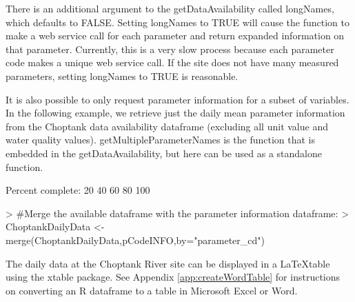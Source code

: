 \documentclass[a4paper,11pt]{article}
\begin{document}
There is an additional argument to the getDataAvailability called longNames, which defaults to FALSE. Setting longNames to TRUE will cause the function to make a web service call for each parameter and return expanded information on that parameter. Currently, this is a very slow process because each parameter code makes a unique web service call. If the site does not have many measured parameters, setting longNames to TRUE is reasonable.

It is also possible to only request parameter information for a subset of variables. In the following example, we retrieve just the daily mean parameter information from the Choptank data availability dataframe (excluding all unit value and water quality values). getMultipleParameterNames is the function that is embedded in the getDataAvailability, but here can be used as a standalone function.


\begin{Schunk}
\begin{Soutput}
Percent complete: 
20 	40 	60 	80 	100 	
\end{Soutput}
\begin{Sinput}
> #Merge the available dataframe with the parameter information dataframe:
> ChoptankDailyData <- merge(ChoptankDailyData,pCodeINFO,by="parameter_cd")
\end{Sinput}
\end{Schunk}

The daily data at the Choptank River site can be displayed in a \LaTeX table using the xtable package. See Appendix \ref{app:createWordTable} for instructions on converting an R dataframe to a table in Microsoft Excel or Word.
\end{document}
